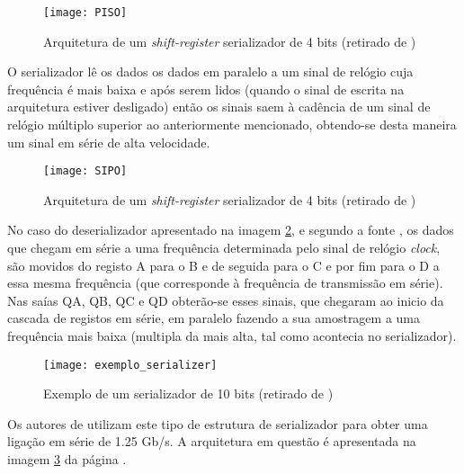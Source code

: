 	\begin{figure}[h!]
	\begin{center}
		\leavevmode
		\texttt{[image: PISO]}
		\caption[Arquitetura de um \textit{shift-register} serializador de 4 bits]{Arquitetura de um \textit{shift-register} serializador de 4 bits (retirado de \cite{R034})}
		\label{fig:piso}
	\end{center}
\end{figure}

O serializador lê os dados os dados em paralelo a um sinal de relógio cuja frequência é mais baixa e após serem lidos (quando o sinal de escrita na arquitetura estiver desligado) então os sinais saem à cadência de um sinal de relógio múltiplo superior ao anteriormente mencionado, obtendo-se desta maneira um sinal em série de alta velocidade.

	\begin{figure}[h!]
	\begin{center}
		\leavevmode
		\texttt{[image: SIPO]}
		\caption[Arquitetura de um \textit{shift-register} deserializador de 4 bits]{Arquitetura de um \textit{shift-register} serializador de 4 bits (retirado de \cite{R034})}
		\label{fig:sipo}
	\end{center}
\end{figure}


No caso do deserializador apresentado na imagem \ref{fig:sipo}, e segundo a fonte \cite{R034}, os dados que chegam em série a uma frequência determinada pelo sinal de relógio \textit{clock}, são movidos do registo A para o B e de seguida para o C e por fim para o D a essa mesma frequência (que corresponde à frequência de transmissão em série). Nas saías QA, QB, QC e QD obterão-se esses sinais, que chegaram ao inicio da cascada de registos em série, em paralelo fazendo a sua amostragem a uma frequência mais baixa (multipla da mais alta, tal como acontecia no serializador).

\begin{figure}[h!]
	\begin{center}
		\leavevmode
		\texttt{[image: exemplo\_serializer]}
		\caption[Exemplo de um serializador de 10 bits]{Exemplo de um serializador de 10 bits (retirado de \cite{R033})}
		\label{fig:exemplo_de_33}
	\end{center}
\end{figure}

Os autores de \cite{R033} utilizam este tipo de estrutura de serializador para obter uma ligação em série de 1.25 Gb/s. A arquitetura em questão é apresentada na imagem \ref{fig:exemplo_de_33} da página \pageref{fig:exemplo_de_33}.

